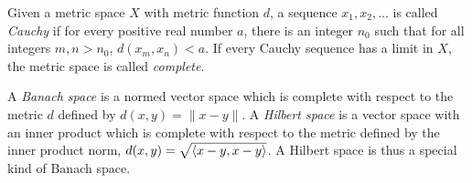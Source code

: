 \documentclass[12pt]{report}
\begin{document}
\begin{defn}[Completeness]
Given a metric space $X$ with metric function $d$, a sequence $x_1, x_2, \ldots$ is called \emph{Cauchy} if for every positive real number $a$, there is an integer $n_0$ such that for all integers $m,n > n_0$, $d(x_m,x_n) < a$. If every Cauchy sequence has a limit in $X$, the metric space is called \emph{complete}.

A \emph{Banach space} is a normed vector space which is complete with respect to the metric $d$ defined by $d(x,y) = \|x - y\|$. A \emph{Hilbert space} is a vector space with an inner product which is complete with respect to the metric defined by the inner product norm, $d(x,y) = \sqrt{\langle x-y, x-y \rangle}$. A Hilbert space is thus a special kind of Banach space.
\end{defn}
\end{document}
